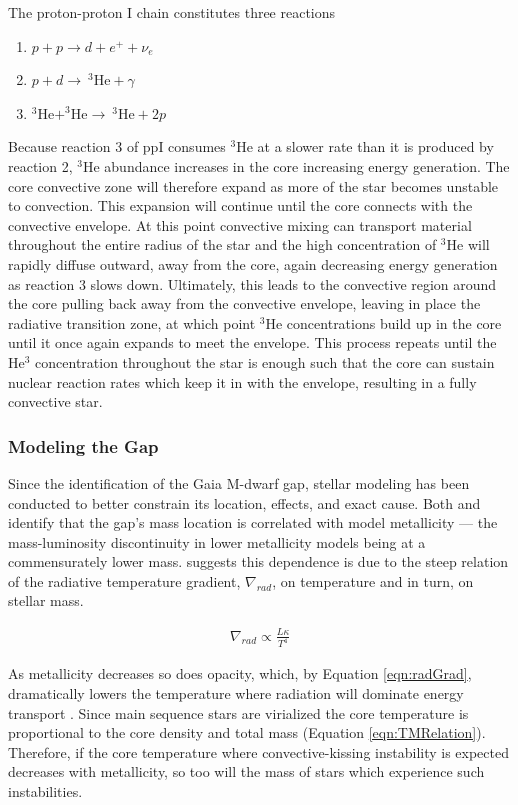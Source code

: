 The proton-proton I chain constitutes three reactions 
\begin{enumerate} 
	\item $p + p \longrightarrow d + e^{+} + \nu_{e}$
	\item $p + d \longrightarrow \ ^{3}\text{He} + \gamma$
	\item $^{3}\text{He} + ^{3}\text{He} \longrightarrow \ ^{3}\text{He} + 2p$ 
\end{enumerate} 
Because reaction 3 of ppI consumes $^{3}$He at a slower rate than it is
produced by reaction 2, $^{3}$He abundance increases in the core increasing
energy generation. The core convective zone will therefore expand as more of
the star becomes unstable to convection. This expansion will continue until the
core connects with the convective envelope. At this point convective mixing can
transport material throughout the entire radius of the star and the high
concentration of $^{3}$He will rapidly diffuse outward, away from the core,
again decreasing energy generation as reaction 3 slows down. Ultimately, this
leads to the convective region around the core pulling back away from the
convective envelope, leaving in place the radiative transition zone, at which
point $^{3}$He concentrations build up in the core until it once again expands
to meet the envelope.  This process repeats until the He$^{3}$ concentration
throughout the star is enough such that the core can sustain nuclear reaction
rates which keep it in with the envelope, resulting in a fully convective star.


\subsubsection{Modeling the Gap}
Since the identification of the Gaia M-dwarf gap, stellar modeling has been
conducted to better constrain its location, effects, and exact cause.
Both \citet{Mansfield2021} and \citet{Feiden2021} identify that the gap's mass
location is correlated with model metallicity --- the mass-luminosity
discontinuity in lower metallicity models being at a commensurately lower mass.
\citet{Feiden2021} suggests this dependence is due to the steep relation of
the radiative temperature gradient, $\nabla_{rad}$, on temperature and in turn,
on stellar mass.

\begin{align}\label{eqn:radGrad}
	\nabla_{rad} \propto \frac{L\kappa}{T^{4}}
\end{align}

As metallicity decreases so does opacity, which, by Equation \ref{eqn:radGrad},
dramatically lowers the temperature where radiation will dominate energy transport
\citep{Chabrier1997}. Since main sequence stars are virialized the core
temperature is proportional to the core density and total mass (Equation
\ref{eqn:TMRelation}). Therefore, if the core temperature where
convective-kissing instability is expected decreases with metallicity, so too
will the mass of stars which experience such instabilities.

